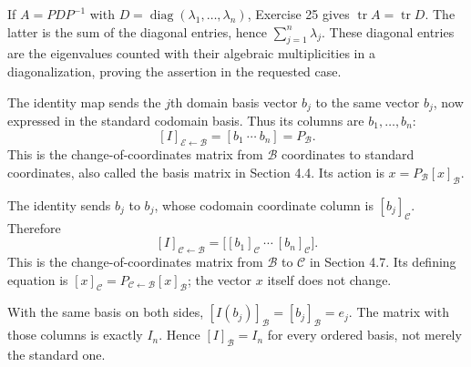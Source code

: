 If $A=PDP^{-1}$ with $D=\operatorname{diag}(\lambda_1,\ldots,\lambda_n)$, Exercise 25 gives $\operatorname{tr}A=\operatorname{tr}D$. The latter is the sum of the diagonal entries, hence $\sum_{j=1}^n\lambda_j$. These diagonal entries are the eigenvalues counted with their algebraic multiplicities in a diagonalization, proving the assertion in the requested case.

The identity map sends the $j$th domain basis vector $b_j$ to the same vector $b_j$, now expressed in the standard codomain basis. Thus its columns are $b_1,\ldots,b_n$:
\[
[I]_{\mathcal E\leftarrow\mathcal B}=[b_1\ \cdots\ b_n]=P_{\mathcal B}.
\]
This is the change-of-coordinates matrix from $\mathcal B$ coordinates to standard coordinates, also called the basis matrix in Section 4.4. Its action is $x=P_{\mathcal B}[x]_{\mathcal B}$.

The identity sends $b_j$ to $b_j$, whose codomain coordinate column is $[b_j]_{\mathcal C}$. Therefore
\[
[I]_{\mathcal C\leftarrow\mathcal B}
=\big[[b_1]_{\mathcal C}\ \cdots\ [b_n]_{\mathcal C}\big].
\]
This is the change-of-coordinates matrix from $\mathcal B$ to $\mathcal C$ in Section 4.7. Its defining equation is $[x]_{\mathcal C}=P_{\mathcal C\leftarrow\mathcal B}[x]_{\mathcal B}$; the vector $x$ itself does not change.

With the same basis on both sides, $[I(b_j)]_{\mathcal B}=[b_j]_{\mathcal B}=e_j$. The matrix with those columns is exactly $I_n$. Hence $[I]_{\mathcal B}=I_n$ for every ordered basis, not merely the standard one.

